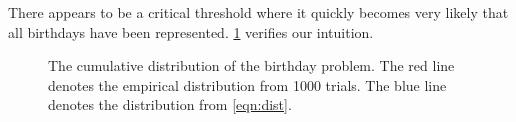 \documentclass[12pt]{article}
\theoremstyle{definition}
\DeclareMathOperator{\pr}{\mathrm{P}}		     %
\DeclareMathOperator{\cov}{\uptau_\textrm{cov}}  %
\begin{document}
There appears to be a critical threshold where it quickly becomes very likely
that all birthdays have been represented.
\cref{fig:birthday} verifies our intuition.

\begin{figure}[ht]
\centering
{}
\caption{The cumulative distribution of the birthday problem. The red line denotes the empirical distribution from 1000 trials. The blue line denotes the distribution from \cref{eqn:dist}.}\label{fig:birthday}
\end{figure}


\newpage
{}

\end{document}
